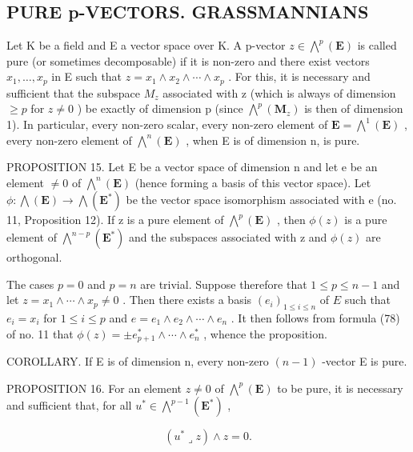 \subsection{PURE p-VECTORS. GRASSMANNIANS}

Let K be a field and E a vector space over K. A p-vector \(z \in \bigwedge^{p}(\mathbf{E})\) is called pure (or sometimes decomposable) if it is non-zero and there exist vectors \(x_{1}, \ldots, x_{p}\) in E such that \(z = x_{1} \wedge x_{2} \wedge \cdots \wedge x_{p}\) . For this, it is necessary and sufficient that the subspace \(M_{z}\) associated with z (which is always of dimension \(\geqslant p\) for \(z \neq 0\) ) be exactly of dimension p (since \(\bigwedge^{p}(\mathbf{M}_{z})\) is then of dimension 1). In particular, every non-zero scalar, every non-zero element of \(\mathbf{E} = \bigwedge^{1}(\mathbf{E})\) , every non-zero element of \(\bigwedge^{n}(\mathbf{E})\) , when E is of dimension n, is pure.

PROPOSITION 15. Let E be a vector space of dimension n and let e be an element \(\neq0\) of \(\bigwedge^{n}(\mathbf{E})\) (hence forming a basis of this vector space). Let \(\phi:\bigwedge(\mathbf{E})\to\bigwedge(\mathbf{E}^{*})\) be the vector space isomorphism associated with e (no. 11, Proposition 12). If z is a pure element of \(\bigwedge^{p}(\mathbf{E})\) , then \(\phi(z)\) is a pure element of \(\bigwedge^{n-p}(\mathbf{E}^{*})\) and the subspaces associated with z and \(\phi(z)\) are orthogonal.

The cases \(p = 0\) and \(p = n\) are trivial. Suppose therefore that \(1 \leqslant p \leqslant n - 1\) and let \(z = x_1 \wedge \cdots \wedge x_p \neq 0\) . Then there exists a basis \((e_i)_{1 \leqslant i \leqslant n}\) of \(E\) such that \(e_i = x_i\) for \(1 \leqslant i \leqslant p\) and \(e = e_1 \wedge e_2 \wedge \cdots \wedge e_n\) . It then follows from formula (78) of no. 11 that \(\phi(z) = \pm e_{p+1}^* \wedge \cdots \wedge e_n^*\) , whence the proposition.

COROLLARY. If E is of dimension n, every non-zero \((n - 1)\) -vector E is pure.

PROPOSITION 16. For an element \(z \neq 0\) of \(\bigwedge^{p}(\mathbf{E})\) to be pure, it is necessary and sufficient that, for all \(u^{*} \in \bigwedge^{p-1}(\mathbf{E}^{*})\) ,

\[
(u ^ {*} \lrcorner z) \wedge z = 0.\tag{81}
\]

